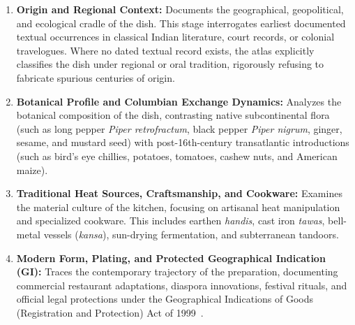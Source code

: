 \documentclass[11pt,a4paper]{report}
\begin{document}
\begin{enumerate}[label=\textbf{Stage \Roman*:}]
    \item \textbf{Origin and Regional Context:} Documents the geographical, geopolitical, and ecological cradle of the dish. This stage interrogates earliest documented textual occurrences in classical Indian literature, court records, or colonial travelogues. Where no dated textual record exists, the atlas explicitly classifies the dish under regional or oral tradition, rigorously refusing to fabricate spurious centuries of origin.
    \item \textbf{Botanical Profile and Columbian Exchange Dynamics:} Analyzes the botanical composition of the dish, contrasting native subcontinental flora (such as long pepper \emph{Piper retrofractum}, black pepper \emph{Piper nigrum}, ginger, sesame, and mustard seed) with post-16th-century transatlantic introductions (such as bird's eye chillies, potatoes, tomatoes, cashew nuts, and American maize).
    \item \textbf{Traditional Heat Sources, Craftsmanship, and Cookware:} Examines the material culture of the kitchen, focusing on artisanal heat manipulation and specialized cookware. This includes earthen \emph{handis}, cast iron \emph{tawas}, bell-metal vessels (\emph{kansa}), sun-drying fermentation, and subterranean tandoors.
    \item \textbf{Modern Form, Plating, and Protected Geographical Indication (GI):} Traces the contemporary trajectory of the preparation, documenting commercial restaurant adaptations, diaspora innovations, festival rituals, and official legal protections under the Geographical Indications of Goods (Registration and Protection) Act of 1999~\cite{giregistry2024}.
\end{enumerate}
\end{document}
